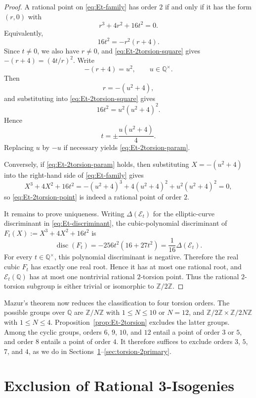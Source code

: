 \documentclass[11pt,a4paper]{amsart}
\theoremstyle{definition}
\theoremstyle{remark}
\numberwithin{equation}{section}
\newcommand{\Q}{\mathbb{Q}}
\newcommand{\Z}{\mathbb{Z}}
\newcommand{\mathcalE}{\mathcal{E}}
\begin{document}
\begin{proof}
A rational point on \eqref{eq:Et-family} has order $2$ if and only if it has the form $(r,0)$ with
\begin{equation}\label{eq:Et-2torsion-cubic}
r^3+4r^2+16t^2=0.
\end{equation}
Equivalently,
\begin{equation}\label{eq:Et-2torsion-square}
16t^2=-r^2(r+4).
\end{equation}
Since $t\neq 0$, we also have $r\neq 0$, and \eqref{eq:Et-2torsion-square} gives $-(r+4)=(4t/r)^2$. Write
\[
-(r+4)=u^2,\qquad u\in\Q^\times.
\]
Then
\[
r=-(u^2+4),
\]
and substituting into \eqref{eq:Et-2torsion-square} gives
\[
16t^2=u^2(u^2+4)^2.
\]
Hence
\[
t=\pm \frac{u(u^2+4)}{4}.
\]
Replacing $u$ by $-u$ if necessary yields \eqref{eq:Et-2torsion-param}.

Conversely, if \eqref{eq:Et-2torsion-param} holds, then substituting $X=-(u^2+4)$ into the right-hand side of \eqref{eq:Et-family} gives
\[
X^3+4X^2+16t^2=-(u^2+4)^3+4(u^2+4)^2+u^2(u^2+4)^2=0,
\]
so \eqref{eq:Et-2torsion-point} is indeed a rational point of order $2$.

It remains to prove uniqueness. Writing $\Delta(\mathcalE_t)$ for the
elliptic-curve discriminant in \eqref{eq:Et-discriminant}, the
cubic-polynomial discriminant of $F_t(X):=X^3+4X^2+16t^2$ is
\[
\operatorname{disc}(F_t)=-256t^2(16+27t^2)
=\frac{1}{16}\Delta(\mathcalE_t).
\]
For every $t\in\Q^\times$, this polynomial discriminant is negative.
Therefore the real cubic \(F_t\) has exactly one real root. Hence it has at
most one rational root, and
$\mathcalE_t(\Q)$ has at most one nontrivial rational $2$-torsion point. Thus
the rational $2$-torsion subgroup is either trivial or isomorphic to
$\Z/2\Z$.
\end{proof}

Mazur's theorem \cite{mazur1977modular,mazur1978rational} now reduces the
classification to four torsion orders. The possible groups over $\Q$ are
$\Z/N\Z$ with $1\leq N\leq10$ or $N=12$, and
$\Z/2\Z\times\Z/2N\Z$ with $1\leq N\leq4$.
Proposition~\ref{prop:Et-2torsion} excludes the latter groups. Among the
cyclic groups, orders $6$, $9$, $10$, and $12$ entail a point of order $3$
or $5$, and order $8$ entails a point of order $4$. It therefore suffices
to exclude orders $3$, $5$, $7$, and $4$, as we do in
Sections~\ref{sec:torsion-3}--\ref{sec:torsion-2primary}.

\section{Exclusion of Rational 3-Isogenies}\label{sec:torsion-3}
\end{document}
